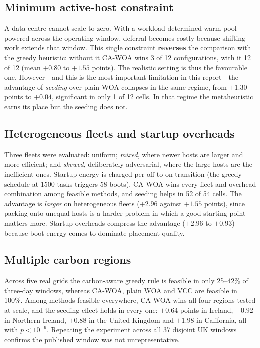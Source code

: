 \documentclass[12pt,a4paper]{article}
\begin{document}
\subsection{Minimum active-host constraint}\label{sec:mmin}
A data centre cannot scale to zero. With a workload-determined warm pool powered across the operating window,
deferral becomes costly because shifting work extends that window. This single constraint \textbf{reverses} the
comparison with the greedy heuristic: without it CA-WOA wins 3 of 12 configurations, with it 12 of 12 (mean
$+0.80$ to $+1.55$ points). The realistic setting is thus the favourable one. However---and this is the most
important limitation in this report---the advantage of \emph{seeding} over plain WOA collapses in the same
regime, from $+1.30$ points to $+0.04$, significant in only 1 of 12 cells. In that regime the metaheuristic
earns its place but the seeding does not.

\subsection{Heterogeneous fleets and startup overheads}\label{sec:het}
Three fleets were evaluated: uniform; \emph{mixed}, where newer hosts are larger and more efficient; and
\emph{skewed}, deliberately adversarial, where the large hosts are the inefficient ones. Startup energy is
charged per off-to-on transition (the greedy schedule at 1500 tasks triggers 58 boots). CA-WOA wins every
fleet and overhead combination among feasible methods, and seeding helps in 52 of 54 cells. The advantage is
\emph{larger} on heterogeneous fleets ($+2.96$ against $+1.55$ points), since packing onto unequal hosts is a
harder problem in which a good starting point matters more. Startup overheads compress the advantage
($+2.96$ to $+0.93$) because boot energy comes to dominate placement quality.

\subsection{Multiple carbon regions}\label{sec:regions}
Across five real grids the carbon-aware greedy rule is feasible in only 25--42\% of three-day windows, whereas
CA-WOA, plain WOA and VCC are feasible in 100\%. Among methods feasible everywhere, CA-WOA wins all four
regions tested at scale, and the seeding effect holds in every one: $+0.64$ points in Ireland, $+0.92$ in
Northern Ireland, $+0.88$ in the United Kingdom and $+1.98$ in California, all with $p<10^{-9}$. Repeating the
experiment across all 37 disjoint UK windows confirms the published window was not unrepresentative.
\end{document}
